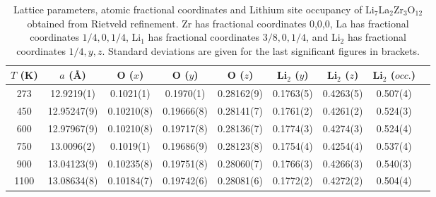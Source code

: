 \documentclass[twoside,twocolumn,9pt]{article}
\begin{document}
\begin{table}[t]
\centering
\caption{Lattice parameters, atomic fractional coordinates and Lithium site occupancy of Li$_7$La$_2$Zr$_3$O$_{12}$ obtained from Rietveld refinement. Zr has fractional coordinates 0,0,0, La has fractional coordinates $1/4,0,1/4$, Li$_1$ has fractional coordinates $3/8,0,1/4$, and Li$_2$ has fractional coordinates $1/4,y,z$. Standard deviations are given for the last significant figures in brackets. }
\label{tab:Rietveld_structure}
\begin{tabular}{ccccccccc}
\hline
\hline
$T$ (K)  & $a$ (\AA) & O ($x$)        & O ($y$)        & O ($z$)        &  Li$_2$ ($y$)       & Li$_2$ ($z$) & Li$_2$ ($occ.$) \\
\hline
273  & 12.9219(1)    & 0.1021(1)      & 0.1970(1)      & 0.28162(9)     & 0.1763(5)           & 0.4263(5)    & 0.507(4) \\
450  & 12.95247(9)   & 0.10210(8)     & 0.19666(8)     & 0.28141(7)     & 0.1761(2)           & 0.4261(2)    & 0.524(3) \\
600  & 12.97967(9)   & 0.10210(8)     & 0.19717(8)     & 0.28136(7)     & 0.1774(3)           & 0.4274(3)    & 0.524(4) \\
750  & 13.0096(2)    & 0.1019(1)      & 0.19686(9)     & 0.28123(8)     & 0.1754(4)           & 0.4254(4)    & 0.537(4) \\
900  & 13.04123(9)   & 0.10235(8)     & 0.19751(8)     & 0.28060(7)     & 0.1766(3)           & 0.4266(3)    & 0.540(3) \\
1100 & 13.08634(8)   & 0.10184(7)     & 0.19742(6)     & 0.28081(6)     & 0.1772(2)           & 0.4272(2)    & 0.504(4) \\
\hline
\hline
\end{tabular}
\end{table}
\end{document}
